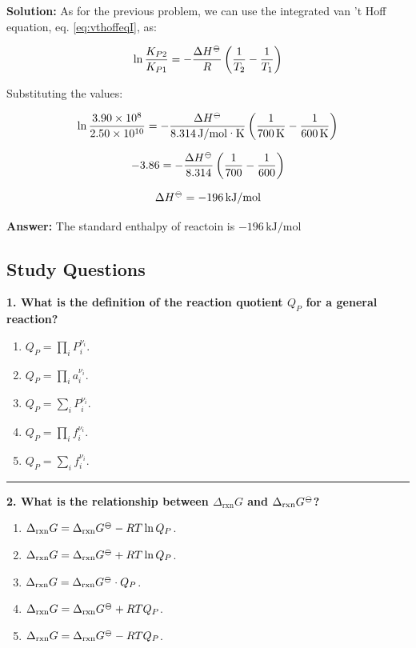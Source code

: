 \documentclass[
  9pt,
]{extbook}
\providecommand{\tightlist}{%
  \setlength{\itemsep}{0pt}\setlength{\parskip}{0pt}}
\theoremstyle{definition}
\theoremstyle{definition}
\theoremstyle{definition}
\theoremstyle{definition}
\theoremstyle{remark}
\begin{document}
\textbf{Solution:} As for the previous problem, we can use the integrated van 't Hoff equation, eq. \eqref{eq:vthoffeqI}, as:

\[\ln \frac{K_{P2}}{K_{P1}} = -\frac{\Delta H^{{-\kern-6pt{\ominus}\kern-6pt-}}}{R}\left(\frac{1}{T_2} - \frac{1}{T_1}\right)\]

Substituting the values:

\[\ln \frac{3.90 \times 10^8}{2.50 \times 10^{10}} = -\frac{\Delta H^{{-\kern-6pt{\ominus}\kern-6pt-}}}{8.314\,\text{J/mol·K}}\left(\frac{1}{700\,\text{K}} - \frac{1}{600\,\text{K}}\right)\]

\[-3.86 = -\frac{\Delta H^{{-\kern-6pt{\ominus}\kern-6pt-}}}{8.314}\left(\frac{1}{700} - \frac{1}{600}\right)\]

\[\Delta H^{{-\kern-6pt{\ominus}\kern-6pt-}} = -196\,\text{kJ/mol}\]

\textbf{Answer:} The standard enthalpy of reactoin is \(-196\,\text{kJ/mol}\)

\subsection{Study Questions}\label{quest10}

\textbf{1. What is the definition of the reaction quotient \(Q_P\) for a general reaction?}

\begin{enumerate}
\def\labelenumi{\alph{enumi}.}
\tightlist
\item
  \(Q_P = \prod_i P_i^{\nu_i}\).
\item
  \(Q_P = \prod_i a_i^{\nu_i}\).
\item
  \(Q_P = \sum_i P_i^{\nu_i}\).
\item
  \(Q_P = \prod_i f_i^{\nu_i}\).
\item
  \(Q_P = \sum_i f_i^{\nu_i}\).
\end{enumerate}

\begin{center}\rule{0.5\linewidth}{0.5pt}\end{center}

\textbf{2. What is the relationship between \(\Delta_{\text{rxn}}G\) and \(\Delta_{\text{rxn}}G^{{-\kern-6pt{\ominus}\kern-6pt-}}\)?}

\begin{enumerate}
\def\labelenumi{\alph{enumi}.}
\tightlist
\item
  \(\Delta_{\text{rxn}}G = \Delta_{\text{rxn}}G^{{-\kern-6pt{\ominus}\kern-6pt-}} - RT\ln Q_P\).
\item
  \(\Delta_{\text{rxn}}G = \Delta_{\text{rxn}}G^{{-\kern-6pt{\ominus}\kern-6pt-}} + RT\ln Q_P\).
\item
  \(\Delta_{\text{rxn}}G = \Delta_{\text{rxn}}G^{{-\kern-6pt{\ominus}\kern-6pt-}} \cdot Q_P\).
\item
  \(\Delta_{\text{rxn}}G = \Delta_{\text{rxn}}G^{{-\kern-6pt{\ominus}\kern-6pt-}} + RTQ_P\).
\item
  \(\Delta_{\text{rxn}}G = \Delta_{\text{rxn}}G^{{-\kern-6pt{\ominus}\kern-6pt-}} - RTQ_P\).
\end{enumerate}
\end{document}
